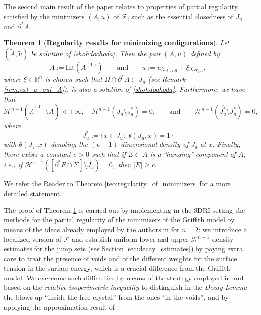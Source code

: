 \documentclass[reqno]{amsart}
\numberwithin{equation}{section}
\theoremstyle{plain}
\newtheorem{theorem}{Theorem}[section]
\theoremstyle{definition}
\newcommand{\R}{\mathbb{R}}
\newcommand{\cH}{\mathcal{H}}
\newcommand{\cF}{\mathcal{F}}
\newcommand{\p}{\partial}
\newcommand{\cl}[1]{\overline{#1}}
\renewcommand{\tilde}{\widetilde}
\newcommand{\Int}[1]{\mathrm{Int}(#1)}
\begin{document}
The second main result of the paper relates to properties of partial regularity satisfied by the minimizers $(A,u)$ of $\cF$, such as the essential closedness of $J_u$ and $\p^*A.$ 

\begin{theorem}[\textbf{Regularity results for minimizing configurations}]\label{teo:reguaksaisa}
Let $(\tilde A,\tilde u)$  be solution of \eqref{shohdoahoda}. Then the pair $(A,u)$ defined by 
$$
A:= \Int{A^{(1)}}\qquad\text{and}\qquad u:= \tilde u\chi_{A\cup S} + \xi \chi_{\Omega\setminus A},
$$
where $\xi\in\R^n$ is chosen  such that $\Omega\cap\p^*A\subset J_u$ (see Remark \ref{rem:ext_u_out_A}), is also a solution of \eqref{shohdoahoda}. Furthermore, we have that
$$
\cH^{n-1}(\tilde A^{(1)} \setminus A)<+\infty,\quad 
\cH^{n-1}(J_u\setminus J_u^*)=0,\qquad\text{and}\qquad
\cH^{n-1}(\cl{J_u^*}\setminus J_u^*)=0,
$$
where 
$$
J_u^*:=\{x\in J_u:\,\, \theta(J_u,x)=1\}
$$
with $\theta(J_u,x)$ denoting the $(n-1)$-dimensional density of $J_u$ at $x.$ Finally, there exists a constant $c>0$ such that if $E\subset A$ is a ``hanging'' component of $A,$  i.e., if $\cH^{n-1}([\p^*E\cap\Sigma]\setminus J_u) =0,$ then $|E| \ge c.$ 
\end{theorem}


\noindent We refer the Reader  to Theorem \ref{teo:regularity_of_minimizers} for a more detailed  statement.

 
The proof of Theorem \ref{teo:reguaksaisa}  is carried out by implementing in the SDRI setting the methods for the partial regularity of the minimizers of the Griffith model by means of the ideas already employed by the authors in \cite{HP:2021_arxiv} for $n=2$: we introduce a localized version of $\cF$ and establish uniform lower and upper $\mathcal{H}^{n-1}$ density estimates for the jump sets (see Section \ref{sec:decay_estimates}) by paying extra care to treat the presence of voids and of the different weights for the surface tension in the surface energy, which is a crucial difference from the Griffith model. We overcome such difficulties by means of the strategy employed in  \cite{P:2012} and based on the \emph{relative isoperimetric inequality} \cite{AFP:2000} to distinguish in the \emph{Decay Lemma} the blows up ``inside the free crystal'' from the ones ``in the voids'', and by applying the approximation result of \cite[Theorem 3]{CCI:2017}.
\end{document}
